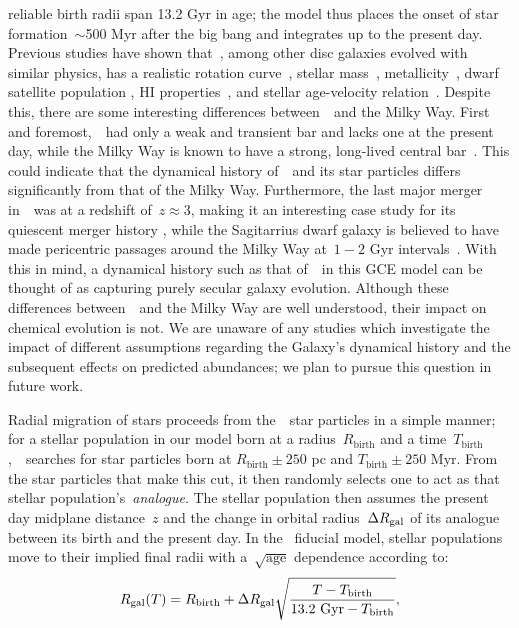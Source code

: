\documentclass[ms.tex]{subfiles}
\begin{document}
reliable birth radii span 13.2 Gyr in age; the model thus places the onset of
star formation~$\sim$500 Myr after the big bang and integrates up to the
present day.
Previous studies have shown that~\hsim, among other disc galaxies evolved with
similar physics, has a realistic rotation curve~\citep{Governato2012,
Christensen2014a, Christensen2014b}, stellar mass~\citep{Munshi2013},
metallicity~\citep{Christensen2016}, dwarf satellite population
\citep{Zolotov2012, Brooks2014}, HI properties~\citep{Brooks2017}, and stellar
age-velocity relation~\citep{Bird2021}.
Despite this, there are some interesting differences between~\hsim~and the
Milky Way.
First and foremost,~\hsim~had only a weak and transient bar and lacks one at
the present day, while the Milky Way is known to have a strong, long-lived
central bar~\citep[e.g.][]{Bovy2019}.
This could indicate that the dynamical history of~\hsim~and its star particles
differs significantly from that of the Milky Way.
Furthermore, the last major merger in~\hsim~was at a redshift of~$z \approx 3$,
making it an interesting case study for its quiescent merger history
\citep[e.g.][]{Zolotov2012}, while the Sagitarrius dwarf galaxy is believed to
have made pericentric passages around the Milky Way at~$1 - 2$ Gyr
intervals~\citep{Law2010}.
With this in mind, a dynamical history such as that of~\hsim~in this GCE model
can be thought of as capturing purely secular galaxy evolution.
Although these differences between~\hsim~and the Milky Way are well understood,
their impact on chemical evolution is not.
We are unaware of any studies which investigate the impact of different
assumptions regarding the Galaxy's dynamical history and the subsequent effects
on predicted abundances; we plan to pursue this question in future work.
\par
Radial migration of stars proceeds from the~\hsim~star particles in a simple
manner; for a stellar population in our model born at a radius~$R_\text{birth}$
and a time~$T_\text{birth}$,~\vice~searches for star particles born at
$R_\text{birth} \pm 250$ pc and $T_\text{birth} \pm 250$ Myr.
From the star particles that make this cut, it then randomly selects one to act
as that stellar population's~\textit{analogue}.
The stellar population then assumes the present day midplane distance~$z$ and
the change in orbital radius~$\Delta R_\text{gal}$ of its analogue between its birth
and the present day.
In the~\citet{Johnson2021} fiducial model, stellar populations move to their
implied final radii with a~$\sqrt{\text{age}}$ dependence according to:
\begin{equation}
R_\text{gal}(T) = R_\text{birth} + \Delta R_\text{gal}
\sqrt{\frac{T - T_\text{birth}}{13.2~\text{Gyr} - T_\text{birth}}},
\end{equation}
\end{document}
